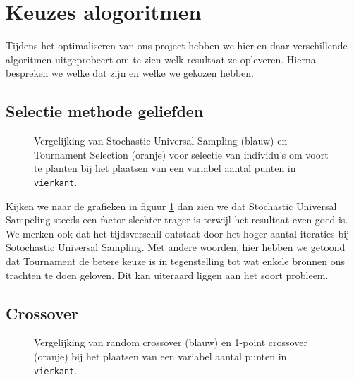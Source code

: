 %
\section{Keuzes alogoritmen}
Tijdens het optimaliseren van ons project hebben we hier en daar verschillende algoritmen uitgeprobeert om te zien welk resultaat ze opleveren. Hierna bespreken we welke dat zijn en welke we gekozen hebben.
\subsection{Selectie methode geliefden}
\label{sub:algLoverSelection}


\begin{figure}[H]
\caption{Vergelijking van Stochastic Universal Sampling (blauw) en Tournament Selection (oranje) voor selectie van individu's om voort te planten bij het plaatsen van een variabel aantal punten in \texttt{vierkant}.}
\label{graf:algLoverSelection}
\end{figure}
Kijken we naar de grafieken in figuur \ref{graf:algLoverSelection} dan zien we dat Stochastic Universal Sampeling steeds een factor slechter trager is terwijl het resultaat even goed is. We merken ook dat het tijdsverschil ontstaat door het hoger aantal iteraties bij Sotochastic Universal Sampling. Met andere woorden, hier hebben we getoond dat Tournament de betere keuze is in tegenstelling tot wat enkele bronnen ons trachten te doen geloven. Dit kan uiteraard liggen aan het soort probleem.


\subsection{Crossover}
\label{ssub:crossover_type}


\begin{figure}[H]
\caption{Vergelijking van random crossover (blauw) en 1-point crossover (oranje) bij het plaatsen van een variabel aantal punten in \texttt{vierkant}.}
\label{graf:algCrossover}
\end{figure}


